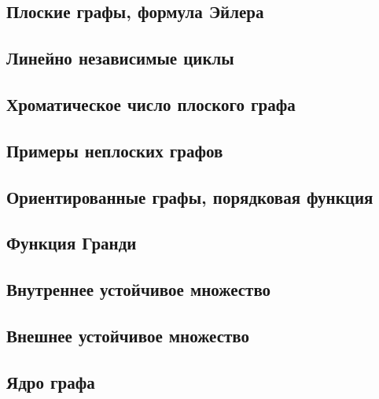 \documentclass[a4paper, 12pt]{extarticle}
\begin{document}




















\subsection{Плоские графы, формула Эйлера}
\subsection{Линейно независимые циклы}
\subsection{Хроматическое число плоского графа}
\subsection{Примеры неплоских графов}
\subsection{Ориентированные графы, порядковая функция}
\subsection{Функция Гранди}
\subsection{Внутреннее устойчивое множество}
\subsection{Внешнее устойчивое множество}
\subsection{Ядро графа}
\end{document}

